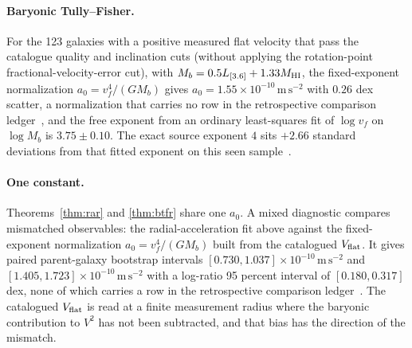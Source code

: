 \documentclass[11pt]{article}
\begin{document}
\paragraph{Baryonic Tully--Fisher.}
For the 123 galaxies with a positive measured flat velocity that pass the
catalogue quality and inclination cuts (without applying the rotation-point
fractional-velocity-error cut),
with \(M_b=0.5L_{[3.6]}+1.33M_{\rm HI}\), the fixed-exponent normalization
\(a_0=v_f^4/(GM_b)\) gives
\(a_0=1.55\times10^{-10}\,\mathrm{m\,s^{-2}}\) with \(0.26\) dex scatter,
a normalization that carries no row in the retrospective comparison
ledger~\cite{ophcontracts}, and the free exponent from an ordinary
least-squares fit of \(\log v_f\) on \(\log M_b\) is \(3.75\pm0.10\). The
exact source exponent \(4\) sits \(+2.66\) standard deviations from that
fitted exponent on this seen sample~\cite{ophcontracts}.

\paragraph{One constant.}
Theorems~\ref{thm:rar} and \ref{thm:btfr} share one \(a_0\). A mixed
diagnostic compares mismatched observables: the radial-acceleration fit
above against the fixed-exponent normalization \(a_0=v_f^4/(GM_b)\) built
from the catalogued \(V_{\rm flat}\). It gives paired parent-galaxy bootstrap intervals
\([0.730,1.037]\times10^{-10}\,\mathrm{m\,s^{-2}}\) and
\([1.405,1.723]\times10^{-10}\,\mathrm{m\,s^{-2}}\) with a log-ratio
95 percent interval of \([0.180,0.317]\) dex, none of which carries a row in
the retrospective comparison ledger~\cite{ophcontracts}. The catalogued
\(V_{\rm flat}\) is read at a finite measurement radius where the baryonic
contribution to \(V^2\) has not been subtracted, and that bias has the
direction of the mismatch.
\end{document}
